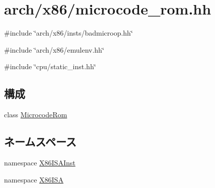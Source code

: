 \hypertarget{arch_2x86_2microcode__rom_8hh}{
\section{arch/x86/microcode\_\-rom.hh}
\label{arch_2x86_2microcode__rom_8hh}
}
{\ttfamily \#include \char`\"{}arch/x86/insts/badmicroop.hh\char`\"{}}\par
{\ttfamily \#include \char`\"{}arch/x86/emulenv.hh\char`\"{}}\par
{\ttfamily \#include \char`\"{}cpu/static\_\-inst.hh\char`\"{}}\par
\subsection*{構成}
\begin{DoxyCompactItemize}
\item 
class \hyperlink{classX86ISAInst_1_1MicrocodeRom}{MicrocodeRom}
\end{DoxyCompactItemize}
\subsection*{ネームスペース}
\begin{DoxyCompactItemize}
\item 
namespace \hyperlink{namespaceX86ISAInst}{X86ISAInst}
\item 
namespace \hyperlink{namespaceX86ISA}{X86ISA}
\end{DoxyCompactItemize}
